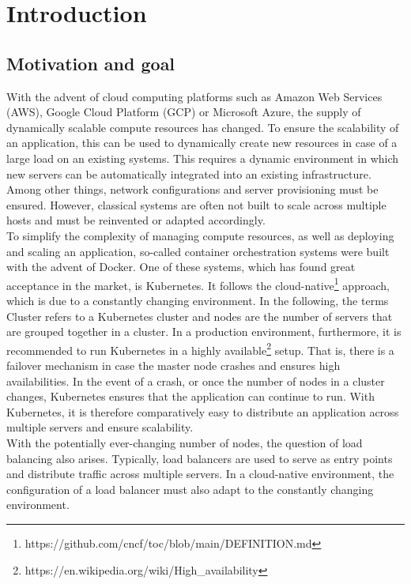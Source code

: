 \chapter{Introduction}


\section{Motivation and goal}
With the advent of cloud computing platforms such as Amazon Web Services (AWS), Google Cloud Platform (GCP) or Microsoft Azure, the supply of dynamically scalable compute resources has changed.
To ensure the scalability of an application, this can be used to dynamically create new resources in case of a large load on an existing systems.
This requires a dynamic environment in which new servers can be automatically integrated into an existing infrastructure.
Among other things, network configurations and server provisioning must be ensured.
However, classical systems are often not built to scale across multiple hosts and must be reinvented or adapted accordingly.
\\
To simplify the complexity of managing compute resources, as well as deploying and scaling an application, so-called container orchestration systems were built with the advent of Docker.
One of these systems, which has found great acceptance in the market, is Kubernetes.
It follows the cloud-native\footnote{https://github.com/cncf/toc/blob/main/DEFINITION.md} approach, which is due to a constantly changing environment.
In the following, the terms Cluster refers to a Kubernetes cluster and nodes are the number of servers that are grouped together in a cluster.
In a production environment, furthermore, it is recommended to run Kubernetes in a highly available\footnote{https://en.wikipedia.org/wiki/High\_availability} setup.
That is, there is a failover mechanism in case the master node crashes and ensures high availabilities.
In the event of a crash, or once the number of nodes in a cluster changes, Kubernetes ensures that the application can continue to run.
With Kubernetes, it is therefore comparatively easy to distribute an application across multiple servers and ensure scalability.
\\
With the potentially ever-changing number of nodes, the question of load balancing also arises.
Typically, load balancers are used to serve as entry points and distribute traffic across multiple servers.
In a cloud-native environment, the configuration of a load balancer must also adapt to the constantly changing environment.
